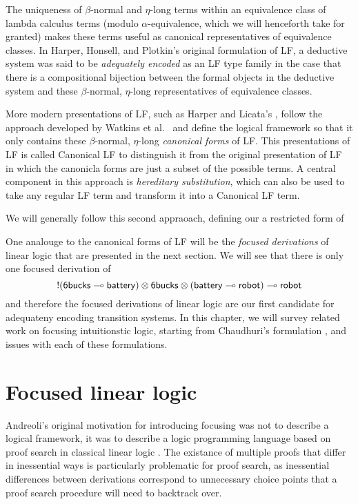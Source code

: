 The uniqueness of $\beta$-normal and $\eta$-long terms within an
equivalence class of lambda calculus terms (modulo
$\alpha$-equivalence, which we will henceforth take for granted) makes
these terms useful as canonical representatives of equivalence
classes. In Harper, Honsell, and Plotkin's original formulation
of LF, a deductive system was said to be {\it adequately encoded} as
an LF type family in the case that there is a compositional bijection
between the formal objects in the deductive system and these
$\beta$-normal, $\eta$-long representatives of equivalence classes.

More modern presentations of LF, such as Harper and Licata's
\cite{harper07mechanizing}, follow the approach developed by Watkins
et al.~\cite{watkins02concurrent} and define the logical framework so
that it only contains these $\beta$-normal, $\eta$-long {\it canonical
  forms} of LF. This presentations of LF is called Canonical LF to
distinguish it from the original presentation of LF in which the
canonicla forms are just a subset of the possible terms. A central
component in this approach is {\it hereditary substitution}, which can
also be used to take any regular LF term and transform it into a
Canonical LF term.

We will generally follow this second appraoach, defining our a
restricted form of

One analouge to the canonical forms of LF will be the {\it focused
  derivations} of linear logic that are presented in the next
section. We will see that there is only
one focused derivation of 
\[{!}({\sf 6bucks} \multimap {\sf battery}) \otimes {\sf 6bucks} \otimes
({\sf battery} \multimap {\sf robot}) \multimap {\sf robot}\] and therefore
the focused derivations of linear logic are our first candidate for
adequateny encoding transition systems. In this chapter, we will
survey related work on focusing intuitionstic logic, starting from
Chaudhuri's formulation \cite{chaudhuri06focused}, and issues with
each of these formulations.

\section{Focused linear logic}

Andreoli's original motivation for introducing focusing was not to
describe a logical framework, it was to describe a logic programming
language based on proof search in classical linear logic
\cite{andreoli92logic}. The existance of multiple proofs that differ
in inessential ways is particularly problematic for proof search, as
inessential differences between derivations correspond to unnecessary
choice points that a proof search procedure will need to backtrack
over. 

